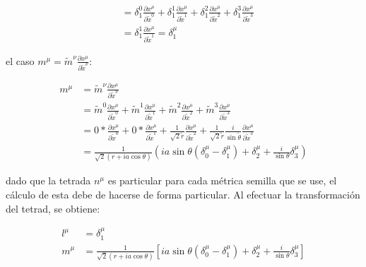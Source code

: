 \begin{enumerate}[1.]
\begin{equation}
\begin{aligned}
                        & = \delta_1^0 \frac{\partial x^\mu}{\partial \tilde{x}^0} + \delta_1^1 \frac{\partial x^\mu}{\partial \tilde{x}^1} + \delta_1^2 \frac{\partial x^\mu}{\partial \tilde{x}^2} + \delta_1^3 \frac{\partial x^\mu}{\partial \tilde{x}^3}     \\
                        & = \delta_1^1 \frac{\partial x^\mu}{\partial \tilde{x}^1} = \delta_1^\mu
              \end{aligned}
          \end{equation}

          el caso $m^\mu = \tilde{m}^\nu \frac{\partial x^\mu}{\partial \tilde{x}^\nu}$:

          \begin{equation}
              \begin{aligned}
                  m^\mu & = \tilde{m}^\nu \frac{\partial x^\mu}{\partial \tilde{x}^\nu}                                                                                                                                                                                                                           \\
                        & = \tilde{m}^0 \frac{\partial x^\mu}{\partial \tilde{x}^0} + \tilde{m}^1 \frac{\partial x^\mu}{\partial \tilde{x}^1} + \tilde{m}^2 \frac{\partial x^\mu}{\partial \tilde{x}^2} + \tilde{m}^3 \frac{\partial x^\mu}{\partial \tilde{x}^3}                                                 \\
                        & = 0 * \frac{\partial x^\mu}{\partial \tilde{x}^0} + 0 * \frac{\partial x^\mu}{\partial \tilde{x}^1} + \frac{1}{\sqrt{2} \tilde{r}} \frac{\partial x^\mu}{\partial \tilde{x}^2} + \frac{1}{\sqrt{2} \tilde{r}} \frac{i}{\sin \tilde{\theta}} \frac{\partial x^\mu}{\partial \tilde{x}^3} \\
                        & = \frac{1}{\sqrt{2}(r + ia \cos \theta)} \left( ia \sin \theta (\delta_0^\mu - \delta_1^\mu) + \delta_2^\mu + \frac{i}{\sin \theta} \delta_3^\mu \right)
              \end{aligned}
          \end{equation}

          dado que la tetrada $n^\mu$ es particular para cada métrica semilla que se use, el cálculo de esta debe de hacerse de forma particular. Al efectuar la transformación del tetrad, se obtiene:

          \begin{equation}
              \begin{aligned}
                  l^\mu & = \delta_1^\mu     \\
                  m^\mu & = \frac{1}{\sqrt{2}(r + ia \cos \theta)} \left[ ia \sin \theta (\delta_0^\mu - \delta_1^\mu) + \delta_2^\mu + \frac{i}{\sin \theta} \delta_3^\mu \right]
              \end{aligned}
          \end{equation}


\end{enumerate}
